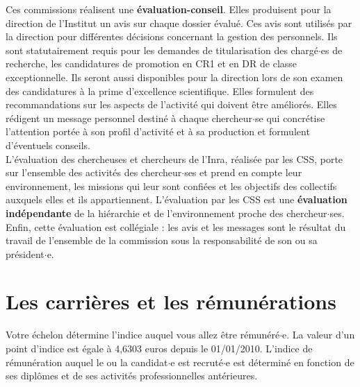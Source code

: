 Ces commissions r\'ealisent une {\bf \'evaluation-conseil}. Elles produisent pour la direction de l'Institut un avis sur chaque dossier \'evalu\'e. Ces avis sont utilis\'es par la direction pour diff\'erentes d\'ecisions concernant la gestion des personnels. Ils sont statutairement requis pour les demandes de titularisation des charg\'e$\cdot$es de recherche, les candidatures de promotion en CR1 et en DR de classe exceptionnelle. Ils seront aussi disponibles pour la direction lors de son examen des candidatures \`a la prime d'excellence scientifique. Elles formulent des recommandations sur les aspects de l'activit\'e qui doivent \^etre am\'elior\'es. Elles r\'edigent un message personnel destin\'e \`a chaque chercheur$\cdot$se qui concr\'etise l'attention port\'ee \`a son profil d'activit\'e et \`a sa production et formulent d'\'eventuels conseils.\\

L'\'evaluation des chercheuses et chercheurs de l'Inra, r\'ealis\'ee par les CSS, porte sur l'ensemble des activit\'es des chercheur$\cdot$ses et prend en compte leur environnement, les missions qui leur sont confi\'ees et les objectifs des collectifs auxquels elles et ils appartiennent. L'\'evaluation par les CSS est une {\bf  \'evaluation ind\'ependante} de la hi\'erarchie et de l'environnement proche des chercheur$\cdot$ses. Enfin, cette \'evaluation est coll\'egiale : les avis et les messages sont le r\'esultat du travail de l'ensemble de la commission sous la responsabilit\'e de son ou sa pr\'esident$\cdot$e.

\section{ Les carri\`eres et les r\'emun\'erations}
Votre \'echelon d\'etermine l'indice auquel vous allez \^etre r\'emun\'er\'e$\cdot$e. La valeur d'un point d'indice est \'egale \`a 4,6303 euros depuis le 01/01/2010. L'indice de r\'emun\'eration auquel le ou la candidat$\cdot$e est recrut\'e$\cdot$e est d\'etermin\'e en fonction de ses dipl\^omes et de ses activit\'es professionnelles ant\'erieures.

